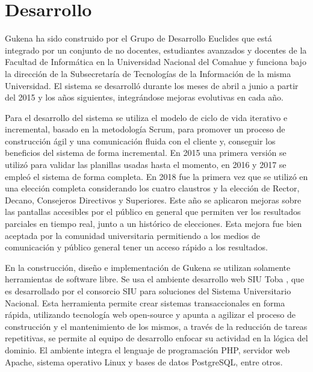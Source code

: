 \section{Desarrollo}
Gukena ha sido construido por el Grupo de Desarrollo Euclides \cite{euclides} que está integrado por un conjunto de no docentes, estudiantes avanzados y docentes de la Facultad de Informática en la Universidad Nacional del Comahue y funciona bajo la dirección de la Subsecretaría de Tecnologías de la Información de la misma Universidad. El sistema se desarrolló durante los meses de abril a junio a partir del 2015 y los años siguientes, integrándose mejoras evolutivas en cada año.

Para el desarrollo del sistema se utiliza el modelo de ciclo de vida iterativo e incremental, basado en la metodología Scrum, para promover un proceso de construcción ágil y una comunicación fluida con el cliente y, conseguir los beneficios del sistema de forma incremental. En 2015 una primera versión se utilizó para validar las planillas usadas hasta el momento, en 2016 y 2017 se empleó el sistema de forma completa.  En 2018 fue la primera vez que se utilizó en una elección completa considerando los cuatro claustros y la elección de Rector, Decano, Consejeros Directivos y Superiores. Este año se aplicaron mejoras sobre las pantallas accesibles por el público en general que permiten ver los resultados parciales en tiempo real, junto a un histórico de elecciones. Esta mejora fue bien aceptada por la comunidad universitaria permitiendo a los medios de comunicación y público general tener un acceso rápido a los resultados.

En la construcción, diseño e implementación de Gukena se utilizan solamente herramientas de software libre. Se usa el ambiente desarrollo web SIU Toba \cite{toba}, que es desarrollado por el consorcio SIU para soluciones del Sistema Universitario Nacional. Esta herramienta  permite crear sistemas transaccionales en forma rápida, utilizando tecnología web open-source y apunta a agilizar el proceso de construcción y el mantenimiento de los mismos, a través de la reducción de tareas repetitivas, se permite al equipo de desarrollo enfocar su actividad en la lógica del dominio.  El ambiente integra el lenguaje de programación PHP, servidor web Apache, sistema operativo Linux y bases de datos PostgreSQL, entre otros.

